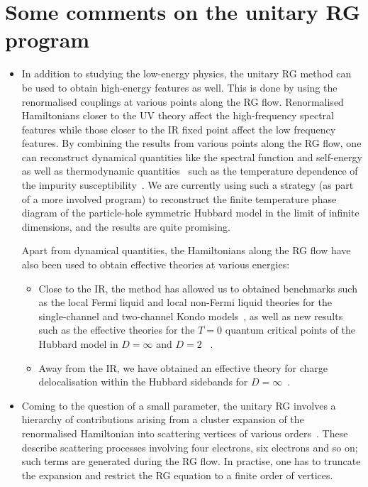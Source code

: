 {\color{\hicol}\section{Some comments on the unitary RG program}
\begin{itemize}
	\item In addition to studying the low-energy physics, the unitary RG method can be used to obtain high-energy features as well. This is done by using the renormalised couplings at various points along the RG flow. Renormalised Hamiltonians closer to the UV theory affect the high-frequency spectral features while those closer to the IR fixed point affect the  low frequency features. By combining the results from various points along the RG flow, one can reconstruct dynamical quantities like the spectral function and self-energy as well as thermodynamic quantities~\cite{Mukherjee_2023,mukherjee2026} such as the temperature dependence of the impurity susceptibility~\cite{anirban_kondo}. We are currently using such a strategy (as part of a more involved program) to reconstruct the finite temperature phase diagram of the particle-hole symmetric Hubbard model in the limit of infinite dimensions, and the results are quite promising.

	Apart from dynamical quantities, the Hamiltonians along the RG flow have also been used to obtain effective theories at various energies:
	\begin{itemize}
		\item Close to the IR, the method has allowed us to obtained benchmarks such as the local Fermi liquid and local non-Fermi liquid theories for the single-channel and two-channel Kondo models~\cite{anirban_kondo,Patra2023MCK}, as well as new results such as the effective theories for the \(T=0\) quantum critical points of the Hubbard model in \(D=\infty\) and \(D=2\) ~\cite{Mukherjee_2023,mukherjee2026}. 
		\item Away from the IR, we have obtained an effective theory for charge delocalisation within the Hubbard sidebands for \(D=\infty\)~\cite{Mukherjee_2023}.
	\end{itemize}
	\item Coming to the question of a small parameter, the unitary RG involves a hierarchy of contributions arising from a cluster expansion of the renormalised Hamiltonian into scattering vertices of various orders~\cite{anirbanurg1}. These describe scattering processes involving four electrons, six electrons and so on; such terms are generated during the RG flow. In practise, one has to truncate the expansion and restrict the RG equation to a finite order of vertices.
\end{itemize}

}
